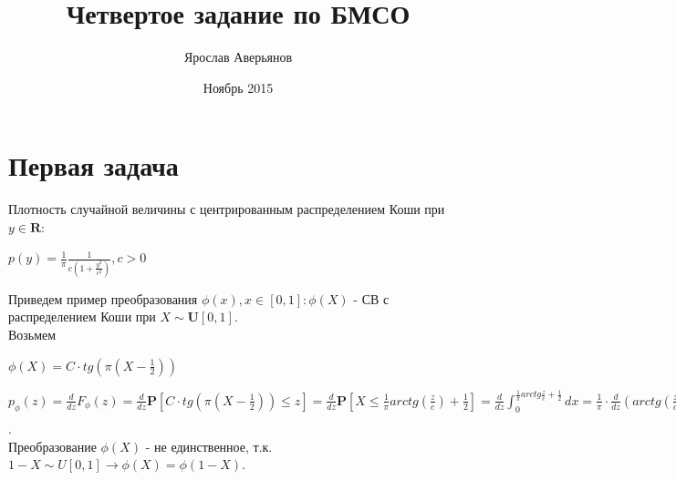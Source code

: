 \documentclass{article}
\title{Четвертое задание по БМСО}
\author{Ярослав Аверьянов}
\date{Ноябрь 2015}
\begin{document}
\maketitle

\section{Первая задача}
Плотность случайной величины с центрированным распределением Коши при $y \in \mathbf{R}$:
\begin{center}
$p(y) = \frac{1}{\pi}\frac{1}{c(1 + \frac{y^2}{c^2})}, c > 0$
\end{center}
Приведем пример преобразования $\phi(x), x \in [0,1] : \phi(X)$ - СВ с распределением Коши при $X \sim \mathbf{U}[0,1]$.\\
Возьмем
\begin{center}
$\phi(X) = C \cdot tg(\pi(X - \frac{1}{2}))$
\end{center}
$p_{\phi}(z) = \frac{d}{dz}F_{\phi}(z) = \frac{d}{dz}\mathbf{P}[C\cdot tg(\pi(X - \frac{1}{2})) \leq z] = \frac{d}{dz} \mathbf{P}[X \leq \frac{1}{\pi}arctg(\frac{z}{c}) + \frac{1}{2}] = \frac{d}{dz} \int_{0}^{\frac{1}{\pi}arctg\frac{z}{c} + \frac{1}{2}} dx = \frac{1}{\pi} \cdot \frac{d}{dz}(arctg(\frac{z}{c}) + \frac{\pi}{2}) = \frac{1}{\pi c(1 + (\frac{z}{c})^2)}$.\\
Преобразование $\phi(X)$ - не единственное, т.к. $1 - X \sim U[0,1] \to \phi(X) = \phi(1 - X)$.
\end{document}
